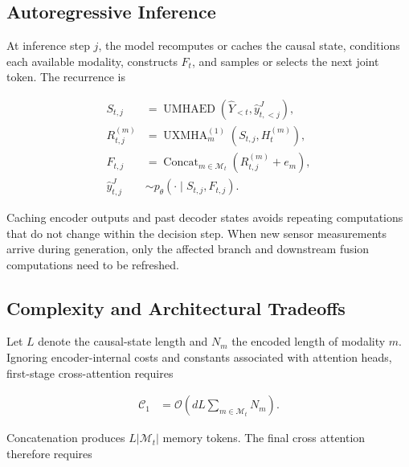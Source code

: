 \subsection{\textbf{Autoregressive Inference}}

At inference step $j$, the model recomputes or caches the causal state, conditions each available modality, constructs $F_t$, and samples or selects the next joint token. The recurrence is

\begin{equation}
\begin{aligned}
    S_{t,j}
    &= \operatorname{UMHAED}\!\left(
       \widehat{Y}_{<t},\widehat{y}_{t,<j}^{J}
       \right),\\
    R_{t,j}^{(m)}
    &= \operatorname{UXMHA}^{(1)}_m\!\left(
       S_{t,j},H_t^{(m)}
       \right),\\
    F_{t,j}
    &= \operatorname{Concat}_{m\in\mathcal{M}_t}
       \left(R_{t,j}^{(m)}+e_m\right),\\
    \widehat{y}_{t,j}^{J}
    &\sim p_{\theta}\!\left(
       \cdot\mid S_{t,j},F_{t,j}
       \right).
\end{aligned}
\label{eq:joint_inference}
\end{equation}

Caching encoder outputs and past decoder states avoids repeating computations that do not change within the decision step. When new sensor measurements arrive during generation, only the affected branch and downstream fusion computations need to be refreshed.

\subsection{\textbf{Complexity and Architectural Tradeoffs}}

Let $L$ denote the causal-state length and $N_m$ the encoded length of modality $m$. Ignoring encoder-internal costs and constants associated with attention heads, first-stage cross-attention requires

\begin{equation}
\begin{aligned}
    \mathcal{C}_{1}
    &= \mathcal{O}\!\left(
       dL\sum_{m\in\mathcal{M}_t}N_m
       \right).
\end{aligned}
\label{eq:joint_stage_one_complexity}
\end{equation}

Concatenation produces $L|\mathcal{M}_t|$ memory tokens. The final cross attention therefore requires

